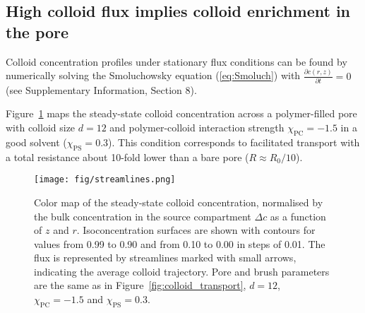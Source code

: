 \documentclass[12pt, a4paper]{article}
\begin{document}
\subsection{High colloid flux implies colloid enrichment in the pore}
Colloid concentration profiles under stationary flux conditions can be found by numerically solving  the Smoluchowsky equation (\ref{eq:Smoluch}) with $\frac{\partial c(r,z)}{\partial t} = 0$  (see Supplementary Information, Section 8). 

Figure~\ref{fig:colloid_concentration} maps the steady-state colloid concentration across a polymer-filled pore with colloid size $d = 12$ and polymer-colloid interaction strength $\chi_{\text{PC}} = -1.5$ in a good solvent ($\chi_{\text{PS}} = 0.3$).
This condition corresponds to facilitated transport with a total resistance about 10-fold lower than a bare pore ($R \approx R_0/10$).

\begin{figure}
    \centering
    \texttt{[image: fig/streamlines.png]}
    \caption{
    Color map of the steady-state colloid concentration, normalised by the bulk concentration in the source compartment $\Delta c$ as a function of $z$ and $r$.
    Isoconcentration surfaces are shown with contours for values from 0.99 to 0.90 and from 0.10 to 0.00 in steps of 0.01.
    The flux is represented by streamlines marked with small arrows, indicating the average colloid trajectory.
    Pore and brush parameters are the same as in Figure~\ref{fig:colloid_transport}, $d = 12$, $\chi_{\text{PC}} = -1.5$ and $\chi_{\text{PS}} = 0.3$.
    }
    \label{fig:colloid_concentration}
\end{figure}
\end{document}
